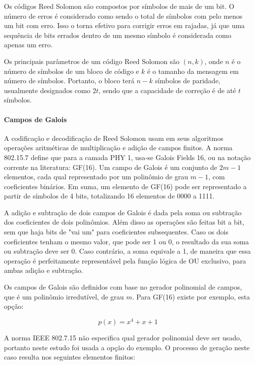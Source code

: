 	Os códigos Reed Solomon são compostos por símbolos de mais de um bit. O número de erros é considerado como sendo o total de símbolos com pelo menos um bit com erro. Isso o torna efetivo para corrigir erros em rajadas, já que uma sequência de bits errados dentro de um mesmo símbolo é considerada como apenas um erro. 
	
	Os principais parâmetros de um código Reed Solomon são $(n, k)$, onde $n$ é o número de símbolos de um bloco de código e $k$ é o tamanho da mensagem em número de símbolos. Portanto, o bloco terá $n - k$ símbolos de paridade, usualmente designados como $2t$, sendo que a capacidade de correção é de até $t$ símbolos.
	
	\paragraph{Campos de Galois}
	
	A codificação e decodificação de Reed Solomon usam em seus algoritmos operações aritméticas de multiplicação e adição de campos finitos. A norma 802.15.7 define que para a camada PHY 1, usa-se Galois Fields 16, ou na notação corrente na literatura: GF(16). Um campo de Galois é um conjunto de $2m - 1$ elementos, cada qual representado por um polinômio de grau $m - 1$, com coeficientes binários. Em suma, um elemento de GF(16) pode ser representado a partir de símbolos de 4 bits, totalizando 16 elementos de 0000 a 1111. 
	
	A adição e subtração de dois campos de Galois é dada pela soma ou subtração dos coeficientes de dois polinômios. Além disso as operações são feitas bit a bit, sem que haja bits de "vai um" para coeficientes subsequentes. Caso os dois coeficientes tenham o mesmo valor, que pode ser 1 ou 0, o resultado da sua soma ou subtração deve ser 0. Caso contrário, a soma equivale a 1, de maneira que essa operação é perfeitamente representável pela função lógica de OU exclusivo, para ambas adição e subtração.
	
	Os campos de Galois são definidos com base no gerador polinomial de campos, que é um polinômio irredutível, de grau $m$. Para GF(16) existe por exemplo, esta opção:
	
	\begin{equation}
	p(x) = x^{4} + x + 1 
	\end{equation}
	
	
	A norma IEEE 802.7.15 não especifica qual gerador polinomial deve ser usado, portanto neste estudo foi usada a opção do exemplo. O processo de geração neste caso resulta nos seguintes elementos finitos:
	 
